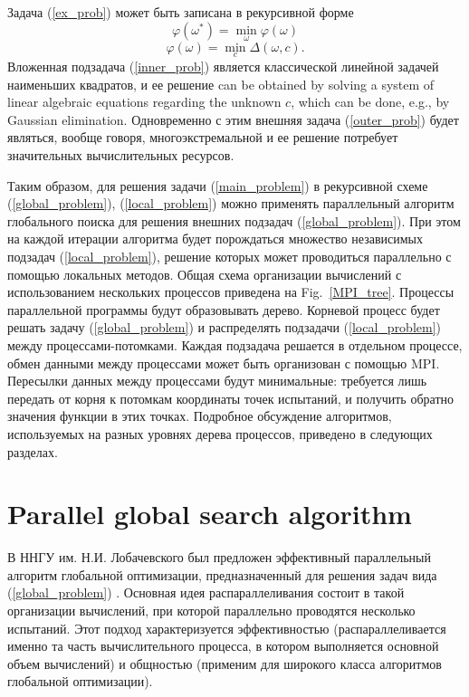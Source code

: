 \documentclass{svproc}
\begin{document}
Задача (\ref{ex_prob}) может быть записана в рекурсивной форме
\begin{equation}\label{outer_prob}
\varphi(\omega^*) = \min_\omega \varphi(\omega)
\end{equation}
\begin{equation}\label{inner_prob}
\varphi(\omega) = \min_c \Delta(\omega,c).
\end{equation}
Вложенная подзадача (\ref{inner_prob}) является классической линейной задачей наименьших квадратов, и ее решение can be obtained by solving a system of linear algebraic equations regarding the unknown $c$, which can be done, e.g., by Gaussian elimination. Одновременно с этим внешняя задача (\ref{outer_prob}) будет являться, вообще говоря, многоэкстремальной и ее решение потребует значительных вычислительных ресурсов.
 
Таким образом, для решения задачи (\ref{main_problem}) в рекурсивной схеме (\ref{global_problem}), (\ref{local_problem}) можно применять параллельный алгоритм глобального поиска для решения внешних подзадач (\ref{global_problem}). При этом на каждой итерации алгоритма будет порождаться множество независимых подзадач (\ref{local_problem}), решение которых может проводиться параллельно с помощью локальных методов.
Общая схема организации вычислений с использованием нескольких процессов приведена на Fig.~\ref{MPI_tree}. 
Процессы параллельной программы будут образовывать дерево. 
Корневой процесс будет решать задачу (\ref{global_problem}) и распределять подзадачи (\ref{local_problem}) между процессами-потомками. Каждая подзадача решается в отдельном процессе, обмен данными между процессами может быть организован с помощью MPI. Пересылки данных между процессами будут минимальные: требуется лишь передать от корня к потомкам координаты точек испытаний, и получить обратно значения функции в этих точках.
Подробное обсуждение алгоритмов, используемых на разных уровнях дерева процессов, приведено в следующих разделах.  

\section{Parallel global search algorithm}

В ННГУ им. Н.И. Лобачевского был предложен \cite{Barkalov2018,Strongin2018,globalizerSystem} эффективный параллельный алгоритм глобальной оптимизации, предназначенный для решения задач вида (\ref{global_problem}) . 
Основная идея распараллеливания состоит в такой организации вычислений, при которой параллельно проводятся несколько испытаний. Этот подход характеризуется эффективностью (распараллеливается именно та часть вычислительного процесса, в котором выполняется основной объем вычислений) и общностью (применим для широкого класса алгоритмов глобальной оптимизации).
\end{document}
